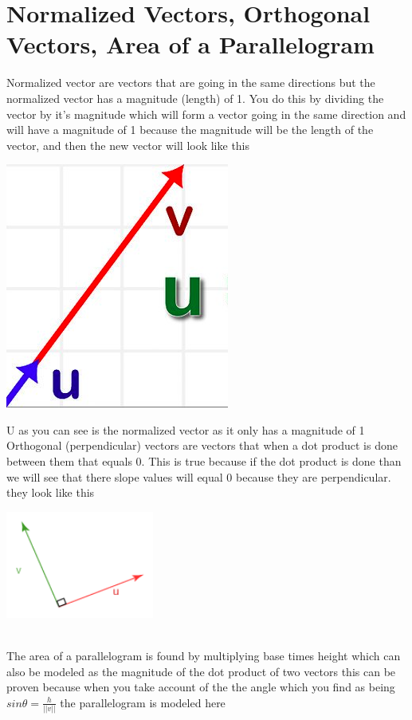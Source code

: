 \documentclass[a4paper,openright, 14pt]{article}
\begin{document}
\section*{Normalized Vectors, Orthogonal Vectors, Area of a Parallelogram} 
Normalized vector are vectors that are going in the same directions but the normalized vector has a magnitude (length) of 1. You do this by dividing the vector by it's magnitude which will form a vector going in the same direction and will have a magnitude of 1 because the magnitude will be the length of the vector, and then the new vector will look like this \begin{center}
\includegraphics[width = 7 cm, height = 5 cm]{norm.png}
\end{center} U as you can see is the normalized vector as it only has a magnitude of 1
\\Orthogonal (perpendicular) vectors are  vectors that when a dot product is done between them that equals 0. This is true because if the dot product is done than we will see that there slope values will equal 0 because they are perpendicular. they look like this \begin{center}
\includegraphics[width = 7 cm, height = 5 cm]{orthogonal.png}
\end{center} \\The area of a parallelogram is found by multiplying base times height which can also be modeled as the magnitude of the dot product of two vectors this can be proven because when you take account of the the angle which you find as being $sin\theta=\frac{h}{||v||}$ the parallelogram is modeled here
\end{document}
